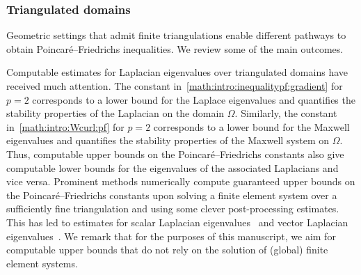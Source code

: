 \documentclass[10pt,a4paper]{article}
\begin{document}
\subsubsection{Triangulated domains}

Geometric settings that admit finite triangulations enable different pathways to obtain Poincar\'e--Friedrichs inequalities. 
We review some of the main outcomes. 

Computable estimates for Laplacian eigenvalues over triangulated domains have received much attention. 
The constant in~\eqref{math:intro:inequalitypf:gradient} for $p=2$ corresponds to a lower bound for the Laplace eigenvalues and quantifies the stability properties of the Laplacian on the domain $\Omega$. 
Similarly, the constant in~\eqref{math:intro:Wcurl:pf} for $p=2$ corresponds to a lower bound for the Maxwell eigenvalues and quantifies the stability properties of the Maxwell system on $\Omega$. 
Thus, computable upper bounds on the Poincar\'e--Friedrichs constants also give computable lower bounds for the eigenvalues of the associated Laplacians and vice versa. 
Prominent methods numerically compute guaranteed upper bounds on the Poincar\'e--Friedrichs constants upon solving a finite element system over a sufficiently fine triangulation and using some clever post-processing estimates.
This has led to estimates for scalar Laplacian eigenvalues~\cite{Cars_Ged_LB_eigs_14,Liu_fram_eigs_15} and vector Laplacian eigenvalues~\cite{gallistl2023computational}. 
We remark that for the purposes of this manuscript, we aim for computable upper bounds that do not rely on the solution of (global) finite element systems. 
\end{document}
